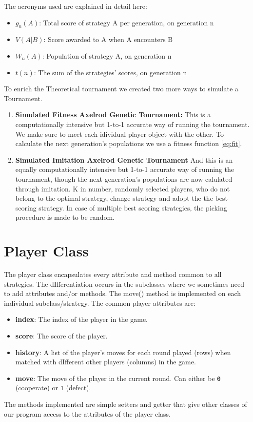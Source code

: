 \documentclass[12pt]{report}
\begin{document}
The acronyms used are explained in detail here:
\begin{itemize}
\item $g_n(A)$: Total score of strategy A per generation, on generation n
\item $V(A|B)$: Score awarded to A when A encounters B
\item $W_n(A)$: Population of strategy A, on generation n
\item $t(n)$: The sum of the strategies' scores, on generation n
\end{itemize}

To enrich the Theoretical tournament we created two more ways to simulate a Tournament.
\begin{enumerate}
\item \textbf{Simulated Fitness Axelrod Genetic Tournament:} This is a computationally intensive but 1-to-1 accurate way of running the tournament. We make sure to meet each idividual player object with the other. To calculate the next generation's populations we use a fitness function \ref{eq:fit}.

\item \textbf{Simulated Imitation Axelrod Genetic Tournament} And this is an equally computationally intensive but 1-to-1 accurate way of running the tournament, though the next generation's populations are now calulated through imitation. K in number, randomly selected players, who do not belong to the optimal strategy, change strategy and adopt the the best scoring strategy. In case of multiple best scoring strategies, the picking procedure is made to be random.
\end{enumerate}
\section{Player Class}
The player class encapsulates every attribute and method common to all strategies. The dIfferentiation occurs in the subclasses where we sometimes need to add attributes and/or methods. The move() method is implemented on each individual subclass/strategy. The common player attributes are:
\begin{itemize}
    \item \textbf{index}: The index of the player in the game.
    \item \textbf{score}: The score of the player.
    \item \textbf{history}: A list of the player's moves for each round played (rows) when matched with dIfferent other players (columns) in the game.
    \item \textbf{move}: The move of the player in the current round. Can either be \texttt{0} (cooperate) or \texttt{1} (defect).
\end{itemize}
The methods implemented are simple setters and getter that give other classes of our program access to the attributes of the player class.
\end{document}
